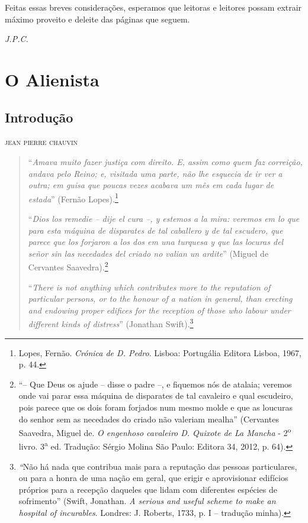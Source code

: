 Feitas essas breves considerações, esperamos que leitoras e leitores
possam extrair máximo proveito e deleite das páginas que seguem.

\bigskip

\hfill{}\emph{J.P.C.}

\part{O Alienista}

\chapter[Introdução, \emph{por Jean Pierre Chauvin}]{Introdução}

\begin{flushright}
\textsc{jean pierre chauvin}
\end{flushright}

\begin{quote}
``\emph{Amava muito fazer justiça com direito. E, assim como quem faz
correição, andava pelo Reino; e, visitada uma parte, não lhe esquecia de
ir ver a outra; em guisa que poucas vezes acabava um mês em cada lugar
de estada}'' (Fernão Lopes).\footnote{Lopes, Fernão. \emph{Crónica de D.
  Pedro}. Lisboa: Portugália Editora Lisboa, 1967, p. 44.}

``\emph{Dios los remedie -- dije el cura --, y estemos a la mira:
veremos em lo que para esta máquina de disparates de tal caballero y de
tal escudero, que parece que los forjaron a los dos em una turquesa y
que las locuras del señor sin las necedades del criado no valian un
ardite}'' (Miguel de Cervantes Saavedra).\footnote{``-- Que Deus os
  ajude -- disse o padre --, e fiquemos nós de atalaia; veremos onde vai
  parar essa máquina de disparates de tal cavaleiro e qual escudeiro,
  pois parece que os dois foram forjados num mesmo molde e que as
  loucuras do senhor sem as necedades do criado não valeriam mealha''
  (Cervantes Saavedra, Miguel de. \emph{O engenhoso cavaleiro D. Quixote
  de La Mancha} - 2\textsuperscript{o} livro. 3\textsuperscript{a} ed.
  Tradução: Sérgio Molina São Paulo: Editora 34, 2012, p. 64).}

``\emph{There is not anything which contributes more to the reputation
of particular persons, or to the honour of a nation in general, than
erecting and endowing proper edifices for the reception of those who
labour under different kinds of distress}'' (Jonathan Swift).\footnote{\emph{``}Não
  há nada que contribua mais para a reputação das pessoas particulares,
  ou para a honra de uma nação em geral, que erigir e aprovisionar
  edifícios próprios para a recepção daqueles que lidam com diferentes
  espécies de sofrimento'' (Swift, Jonathan. \emph{A serious and useful
  scheme to make an hospital of incurables}. Londres: J. Roberts, 1733,
  p. I -- tradução minha).}
\end{quote}

